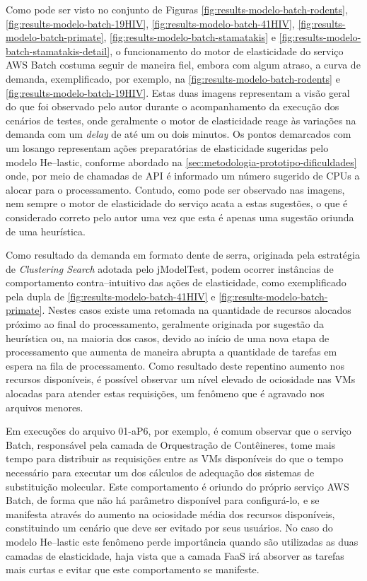 \documentclass[english,brazilian]{UNISINOSmonografia} %
\begin{document}
Como pode ser visto no conjunto de Figuras 
\ref{fig:results-modelo-batch-rodents}, 
\ref{fig:results-modelo-batch-19HIV},
\ref{fig:results-modelo-batch-41HIV},
\ref{fig:results-modelo-batch-primate},
\ref{fig:results-modelo-batch-stamatakis} e
\ref{fig:results-modelo-batch-stamatakis-detail},
o funcionamento do motor de elasticidade do serviço AWS Batch costuma seguir de maneira fiel, embora com algum atraso, a curva de demanda, exemplificado, por exemplo, na \autoref{fig:results-modelo-batch-rodents} e \autoref{fig:results-modelo-batch-19HIV}.
%
Estas duas imagens representam a visão geral do que foi observado pelo autor durante o acompanhamento da execução dos cenários de testes, onde geralmente o motor de elasticidade reage às variações na demanda com um \textit{delay} de até um ou dois minutos.
%
Os pontos demarcados com um losango representam ações preparatórias de elasticidade sugeridas pelo modelo \textsf{He}--lastic, conforme abordado na \autoref{sec:metodologia-prototipo-dificuldades} onde, por meio de chamadas de API é informado um número sugerido de CPUs a alocar para o processamento.
%
Contudo, como pode ser observado nas imagens, nem sempre o motor de elasticidade do serviço acata a estas sugestões, o que é considerado correto pelo autor uma vez que esta é apenas uma sugestão oriunda de uma heurística.


Como resultado da demanda em formato dente de serra, originada pela estratégia de \textit{Clustering Search} adotada pelo jModelTest, podem ocorrer instâncias de comportamento contra--intuitivo das ações de elasticidade, como exemplificado pela dupla de \autoref{fig:results-modelo-batch-41HIV} e \autoref{fig:results-modelo-batch-primate}.
%
Nestes casos existe uma retomada na quantidade de recursos alocados próximo ao final do processamento, geralmente originada por sugestão da heurística ou, na maioria dos casos, devido ao início de uma nova etapa de processamento que aumenta de maneira abrupta a quantidade de tarefas em espera na fila de processamento.
%
Como resultado deste repentino aumento nos recursos disponíveis, é possível observar um nível elevado de ociosidade nas VMs alocadas para atender estas requisições, um fenômeno que é agravado nos arquivos menores.



Em execuções do arquivo 01-aP6, por exemplo, é comum observar que o serviço Batch, responsável pela camada de Orquestração de Contêineres, tome mais tempo para distribuir as requisições entre as VMs disponíveis do que o tempo necessário para executar um dos cálculos de adequação dos sistemas de substituição molecular.
%
Este comportamento é oriundo do próprio serviço AWS Batch, de forma que não há parâmetro disponível para configurá-lo, e se manifesta através do aumento na ociosidade média dos recursos disponíveis, constituindo um cenário que deve ser evitado por seus usuários.
%
No caso do modelo \textsf{He}--lastic este fenômeno perde importância quando são utilizadas as duas camadas de elasticidade, haja vista que a camada FaaS irá absorver as tarefas mais curtas e evitar que este comportamento se manifeste.
\end{document}
